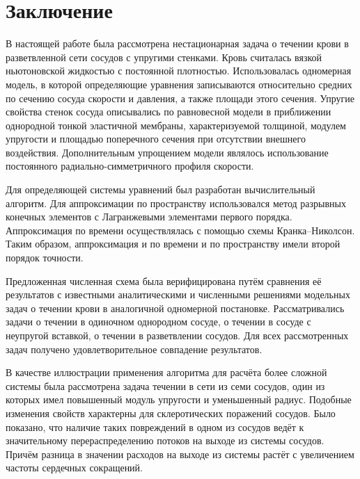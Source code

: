 \section{Заключение}
В настоящей работе была рассмотрена нестационарная задача о течении крови в разветвленной сети сосудов с упругими стенками.
Кровь считалась вязкой ньютоновской жидкостью с постоянной плотностью.
Использовалась одномерная модель, в которой определяющие уравнения записываются относительно
средних по сечению сосуда скорости и давления, а также площади этого сечения.
Упругие свойства стенок сосуда описывались по равновесной модели в приближении однородной тонкой эластичной мембраны,
характеризуемой толщиной, модулем упругости и площадью поперечного сечения при отсутствии внешнего воздействия.
Дополнительным упрощением модели являлось использование постоянного радиально-симметричного профиля скорости.

Для определяющей системы уравнений был разработан вычислительный алгоритм. Для аппроксимации по пространству
использовался метод разрывных конечных элементов с Лагранжевыми элементами первого порядка.
Аппроксимация по времени осуществлялась с помощью схемы Кранка--Николсон.
Таким образом, аппроксимация и по времени и по пространству имели второй порядок точности.

Предложенная численная схема была верифицирована путём сравнения её результатов с известными
аналитическими и численными решениями модельных задач о течении крови в аналогичной одномерной постановке.
Рассматривались задачи о течении в одиночном однородном сосуде, о течении в сосуде с неупругой вставкой,
о течении в разветвлении сосудов.
Для всех рассмотренных задач получено удовлетворительное совпадение результатов.

В качестве иллюстрации применения алгоритма для расчёта более сложной системы
была рассмотрена задача течении в сети из семи сосудов,
один из которых имел повышенный модуль упругости и уменьшенный
радиус. Подобные изменения свойств характерны для склеротических поражений сосудов.
Было показано, что наличие таких повреждений в одном из сосудов
ведёт к значительному перераспределению
потоков на выходе из системы сосудов.
Причём разница в значении расходов на выходе из системы
растёт с увеличением частоты сердечных сокращений.
